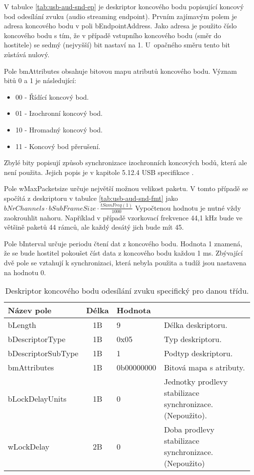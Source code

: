 V tabulce \ref{tab:usb-aud-snd-ep} je deskriptor koncového bodu popisující koncový bod odesílání zvuku (audio streaming endpoint). Prvním zajímavým polem je adresa koncového bodu v poli bEndpointAddress. Jako adresa je použito číslo koncového bodu s tím, že v případě vstupního koncového bodu (směr do hostitele) se sedmý (nejvyšší) bit nastaví na 1. U~opačného směru tento bit zůstává nulový.

Pole bmAttributes obsahuje bitovou mapu atributů koncového bodu. Význam bitů 0 a 1 je následující:
\begin{itemize}
\item 00 - Řídící koncový bod.
\item 01 - Izochronní koncový bod.
\item 10 - Hromadný koncový bod.
\item 11 - Koncový bod přerušení.
\end{itemize}
Zbylé bity popisují způsob synchronizace izochronních koncových bodů, která ale není použita. Jejich popis je v kapitole  5.12.4 USB specifikace \cite{usb-spec}.


Pole wMaxPacketsize určuje největší možnou velikost paketu. V tomto případě se spočítá z deskriptoru v tabulce \ref{tab:usb-aud-snd-fmt} jako $ bNrChannels \cdot bSubFrameSize \cdot \frac{tSamFreq(1)}{1000} $ Vypočtenou hodnotu je nutné vždy zaokrouhlit nahoru. Například v případě vzorkovací frekvence 44,1 kHz bude ve většině paketů 44 rámců, ale každý desátý jich bude mít 45.

Pole bInterval určuje periodu čtení dat z koncového bodu. Hodnota 1 znamená, že se bude hostitel pokoušet číst data z koncového bodu každou 1 ms. Zbývající dvě pole se vztahují k synchronizaci, která nebyla použita a tudíž jsou nastavena na hodnotu 0.

\begin{table}[ht!]
\begin{center}
\begin{tabular}{|l|c|l|l|}
\hline 
Název pole & Délka & Hodnota &  \\ 
\hline
bLength & 1B & 9 & Délka deskriptoru.\\
\hline
bDescriptorType & 1B & 0x05 & Typ deskriptoru. \\
\hline
bDescriptorSubType & 1B & 1 & Podtyp deskriptoru. \\
\hline
bmAttributes & 1B & 0b00000000 & Bitová mapa s atributy.\\ %
\hline
bLockDelayUnits & 1B & 0 & \makecell[l]{Jednotky prodlevy stabilizace\\ synchronizace. (Nepoužito).}\\ %
\hline
wLockDelay & 2B & 0 & \makecell[l]{Doba prodlevy stabilizace\\ synchronizace. (Nepoužito)} \\ %
\hline
\end{tabular} 
\end{center}
\caption{Deskriptor koncového bodu odesílání zvuku specifický pro danou třídu.}
\label{tab:usb-aud-snd-ep-spec} 
\end{table}


